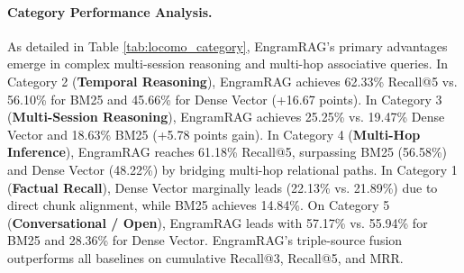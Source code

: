 \documentclass[conference]{IEEEtran}
\begin{document}
\begin{table}[t]
\centering
{}
\caption{Category-wise Recall@5 (\%) on LoCoMo across all 1,982 questions. Bold indicates the top-performing model in each category.}
\label{tab:locomo_category}
\end{table}

\paragraph{Category Performance Analysis.}
As detailed in Table \ref{tab:locomo_category}, EngramRAG's primary advantages emerge in complex multi-session reasoning and multi-hop associative queries. In Category 2 (\textbf{Temporal Reasoning}), EngramRAG achieves 62.33\% Recall@5 vs. 56.10\% for BM25 and 45.66\% for Dense Vector (+16.67 points). In Category 3 (\textbf{Multi-Session Reasoning}), EngramRAG achieves 25.25\% vs. 19.47\% Dense Vector and 18.63\% BM25 (+5.78 points gain). In Category 4 (\textbf{Multi-Hop Inference}), EngramRAG reaches 61.18\% Recall@5, surpassing BM25 (56.58\%) and Dense Vector (48.22\%) by bridging multi-hop relational paths. In Category 1 (\textbf{Factual Recall}), Dense Vector marginally leads (22.13\% vs. 21.89\%) due to direct chunk alignment, while BM25 achieves 14.84\%. On Category 5 (\textbf{Conversational / Open}), EngramRAG leads with 57.17\% vs. 55.94\% for BM25 and 28.36\% for Dense Vector. EngramRAG's triple-source fusion outperforms all baselines on cumulative Recall@3, Recall@5, and MRR.

\enlargethispage{2\baselineskip}
\end{document}
